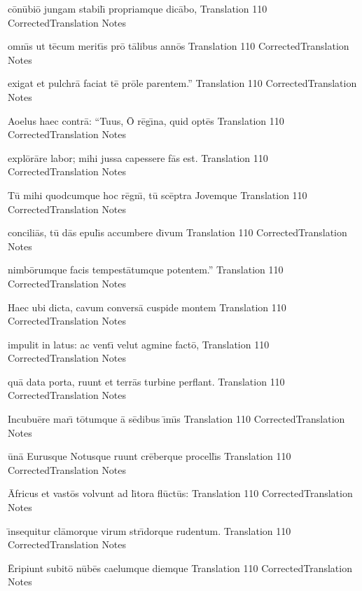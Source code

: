 \documentclass[]{article}
\begin{document}
\latline
  {c\={\macron o}n\={\macron u}bi\={\macron o} jungam stabil\={\macron \i} propriamque dic\={\macron a}bo,
}
  { Translation }
  {110}
  { CorrectedTranslation }
  { Notes }


\latline
  {omn\={\macron \i}s ut t\={\macron e}cum merit\={\macron \i}s pr\={\macron o} t\={\macron a}libus ann\={\macron o}s
}
  { Translation }
  {110}
  { CorrectedTranslation }
  { Notes }


\latline
  {exigat et pulchr\={\macron a} faciat t\={\macron e} pr\={\macron o}le parentem.''
}
  { Translation }
  {110}
  { CorrectedTranslation }
  { Notes }


\latline
  {Aoelus haec contr\={\macron a}:  ``Tuus, \={\macron O} r\={\macron e}g\={\macron \i}na, quid opt\={\macron e}s
}
  { Translation }
  {110}
  { CorrectedTranslation }
  { Notes }


\latline
  {expl\={\macron o}r\={\macron a}re labor; mihi jussa capessere f\={\macron a}s est.
}
  { Translation }
  {110}
  { CorrectedTranslation }
  { Notes }


\latline
  {T\={\macron u} mihi quodcumque hoc r\={\macron e}gn\={\macron \i}, t\={\macron u} sc\={\macron e}ptra Jovemque
}
  { Translation }
  {110}
  { CorrectedTranslation }
  { Notes }


\latline
  {concili\={\macron a}s, t\={\macron u} d\={\macron a}s epul\={\macron \i}s accumbere d\={\macron \i}vum
}
  { Translation }
  {110}
  { CorrectedTranslation }
  { Notes }


\latline
  {nimb\={\macron o}rumque facis tempest\={\macron a}tumque potentem.''
}
  { Translation }
  {110}
  { CorrectedTranslation }
  { Notes }


\latline
  {Haec ubi dicta, cavum convers\={\macron a} cuspide montem
}
  { Translation }
  {110}
  { CorrectedTranslation }
  { Notes }


\latline
  {impulit in latus:  ac vent\={\macron \i} velut agmine fact\={\macron o},
}
  { Translation }
  {110}
  { CorrectedTranslation }
  { Notes }


\latline
  {qu\={\macron a} data porta, ruunt et terr\={\macron a}s turbine perflant.
}
  { Translation }
  {110}
  { CorrectedTranslation }
  { Notes }


\latline
  {Incubu\={\macron e}re mar\={\macron \i} t\={\macron o}tumque \={\macron a} s\={\macron e}dibus \={\macron \i}m\={\macron \i}s
}
  { Translation }
  {110}
  { CorrectedTranslation }
  { Notes }


\latline
  {\={\macron u}n\={\macron a} Eurusque Notusque ruunt cr\={\macron e}berque procell\={\macron \i}s
}
  { Translation }
  {110}
  { CorrectedTranslation }
  { Notes }


\latline
  {\={\macron A}fricus et vast\={\macron o}s volvunt ad l\={\macron \i}tora fl\={\macron u}ct\={\macron u}s:
}
  { Translation }
  {110}
  { CorrectedTranslation }
  { Notes }


\latline
  {\={\macron \i}nsequitur cl\={\macron a}morque virum str\={\macron \i}dorque rudentum.
}
  { Translation }
  {110}
  { CorrectedTranslation }
  { Notes }


\latline
  {\={\macron E}ripiunt subit\={\macron o} n\={\macron u}b\={\macron e}s caelumque diemque
}
  { Translation }
  {110}
  { CorrectedTranslation }
  { Notes }
\end{document}
